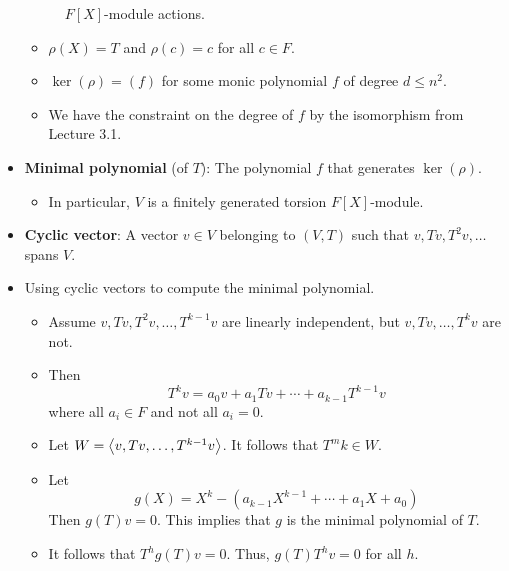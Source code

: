 \documentclass[../notes.tex]{subfiles}
\begin{document}
\begin{itemize}
\begin{figure}[H]
        \caption{$F[X]$-module actions.}
        \label{fig:fXmodAction}
    \end{figure}
    \begin{itemize}
        \item $\rho(X)=T$ and $\rho(c)=c$ for all $c\in F$.
        \item $\ker(\rho)=(f)$ for some monic polynomial $f$ of degree $d\leq n^2$.
        \item We have the constraint on the degree of $f$ by the isomorphism from Lecture 3.1.
    \end{itemize}
    \item \textbf{Minimal polynomial} (of $T$): The polynomial $f$ that generates $\ker(\rho)$.
    \begin{itemize}
        \item In particular, $V$ is a finitely generated torsion $F[X]$-module.
    \end{itemize}
    \item \textbf{Cyclic vector}: A vector $v\in V$ belonging to $(V,T)$ such that $v,Tv,T^2v,\dots$ spans $V$.
    \item Using cyclic vectors to compute the minimal polynomial.
    \begin{itemize}
        \item Assume $v,Tv,T^2v,\dots,T^{k-1}v$ are linearly independent, but $v,Tv,\dots,T^kv$ are not.
        \item Then
        \begin{equation*}
            T^kv = a_0v+a_1Tv+\cdots+a_{k-1}T^{k-1}v
        \end{equation*}
        where all $a_i\in F$ and not all $a_i=0$.
        \item Let $W=\left\langle{v,Tv,\dots,T^{k-1}v}\right\rangle$. It follows that $T^mk\in W$.
        \item Let
        \begin{equation*}
            g(X) = X^k-(a_{k-1}X^{k-1}+\cdots+a_1X+a_0)
        \end{equation*}
        Then $g(T)v=0$. This implies that $g$ is the minimal polynomial of $T$.
        \item It follows that $T^hg(T)v=0$. Thus, $g(T)T^hv=0$ for all $h$.

\end{itemize}
\end{itemize}
\end{document}
